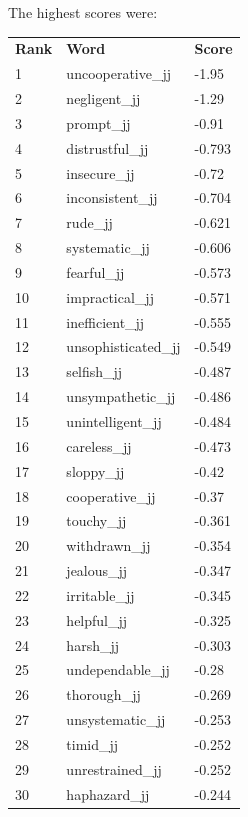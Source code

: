 \documentclass[10pt,letterpaper]{book}
\begin{document}
The highest scores were:
\begin{tabular}{ l l l }
        \textbf{Rank} & \textbf{Word} & \textbf{Score} \\
        1 & uncooperative\_jj & -1.95 \\
        2 & negligent\_jj & -1.29 \\
        3 & prompt\_jj & -0.91 \\
        4 & distrustful\_jj & -0.793 \\
        5 & insecure\_jj & -0.72 \\
        6 & inconsistent\_jj & -0.704 \\
        7 & rude\_jj & -0.621 \\
        8 & systematic\_jj & -0.606 \\
        9 & fearful\_jj & -0.573 \\
        10 & impractical\_jj & -0.571 \\
        11 & inefficient\_jj & -0.555 \\
        12 & unsophisticated\_jj & -0.549 \\
        13 & selfish\_jj & -0.487 \\
        14 & unsympathetic\_jj & -0.486 \\
        15 & unintelligent\_jj & -0.484 \\
        16 & careless\_jj & -0.473 \\
        17 & sloppy\_jj & -0.42 \\
        18 & cooperative\_jj & -0.37 \\
        19 & touchy\_jj & -0.361 \\
        20 & withdrawn\_jj & -0.354 \\
        21 & jealous\_jj & -0.347 \\
        22 & irritable\_jj & -0.345 \\
        23 & helpful\_jj & -0.325 \\
        24 & harsh\_jj & -0.303 \\
        25 & undependable\_jj & -0.28 \\
        26 & thorough\_jj & -0.269 \\
        27 & unsystematic\_jj & -0.253 \\
        28 & timid\_jj & -0.252 \\
        29 & unrestrained\_jj & -0.252 \\
        30 & haphazard\_jj & -0.244 \\
\end{tabular}
\end{document}
